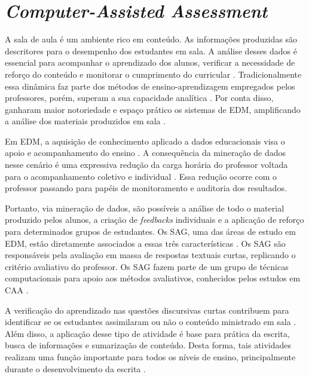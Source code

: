 \section{\textit{Computer-Assisted Assessment}}

A sala de aula é um ambiente rico em conteúdo. As informações produzidas são descritores para o desempenho dos estudantes em sala. A análise desses dados é essencial para acompanhar o aprendizado dos alunos, verificar a necessidade de reforço do conteúdo e monitorar o cumprimento do curricular \cite{sweta2021}. Tradicionalmente essa dinâmica faz parte dos métodos de ensino-aprendizagem empregados pelos professores, porém, superam a sua capacidade analítica \cite{madero2019}. Por conta disso, ganharam maior notoriedade e espaço prático os sistemas de EDM, amplificando a análise dos materiais produzidos em sala \cite{siemens2012, romero2010}.

Em EDM, a aquisição de conhecimento aplicado a dados educacionais visa o apoio e acompanhamento do ensino \cite{ferreira-mello2019}. A consequência da mineração de dados nesse cenário é uma expressiva redução da carga horária do professor voltada para o acompanhamento coletivo e individual \cite{sweta2021}. Essa redução ocorre com o professor passando para papéis de monitoramento e auditoria dos resultados.

Portanto, via mineração de dados, são possíveis a análise de todo o material produzido pelos alunos, a criação de \textit{feedbacks} individuais e a aplicação de reforço para determinados grupos de estudantes. Os SAG, uma das áreas de estudo em EDM, estão diretamente associados a essas três características \cite{burrows2015}. Os SAG são responsáveis pela avaliação em massa de respostas textuais curtas, replicando o critério avaliativo do professor. Os SAG fazem parte de um grupo de técnicas computacionais para apoio aos métodos avaliativos, conhecidos pelos estudos em CAA \cite{perez-marin2009}.

A verificação do aprendizado nas questões discursivas curtas contribuem para identificar se os estudantes assimilaram ou não o conteúdo ministrado em sala \cite{oliveira2013}. Além disso, a aplicação desse tipo de atividade é base para prática da escrita, busca de informações e sumarização de conteúdo. Desta forma, tais atividades realizam uma função importante para todos os níveis de ensino, principalmente durante o desenvolvimento da escrita \cite{johnstone2002}. 


